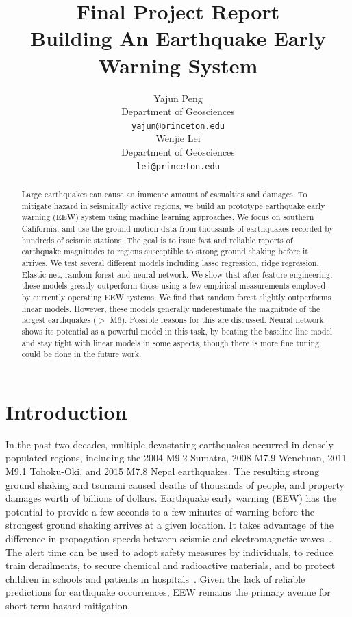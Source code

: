 \documentclass{article} %
\title{Final Project Report \\Building An Earthquake Early Warning System}
\author{
Yajun Peng\\
Department of Geosciences\\
\texttt{yajun@princeton.edu} \\
\And
Wenjie Lei \\
Department of Geosciences \\
\texttt{lei@princeton.edu} \\
}
\begin{document}
\maketitle

\begin{abstract}
Large earthquakes can cause an immense amount of casualties and damages. To mitigate hazard in seismically active regions, we build an prototype earthquake early warning (EEW) system using machine learning approaches. We focus on southern California, and use the ground motion data from thousands of earthquakes recorded by hundreds of seismic stations. The goal is to issue fast and reliable reports of earthquake magnitudes to regions susceptible to strong ground shaking before it arrives. We test several different models including lasso regression, ridge regression, Elastic net, random forest and neural network. We show that after feature engineering, these models greatly outperform those using a few empirical measurements employed by currently operating EEW systems. We find that random forest slightly outperforms linear models. However, these models generally underestimate the magnitude of the largest earthquakes ($>$ M6). Possible reasons for this are discussed. Neural network shows its potential as a powerful model in this task, by beating the baseline line model and stay tight with linear models in some aspects, though there is more fine tuning could be done in the future work.

\end{abstract}

\section{Introduction}
In the past two decades, multiple devastating earthquakes occurred in densely populated regions, including the 2004 M9.2 Sumatra, 2008 M7.9 Wenchuan, 2011 M9.1 Tohoku-Oki, and 2015 M7.8 Nepal earthquakes. The resulting strong ground shaking and tsunami caused deaths of thousands of people, and property damages worth of billions of dollars. Earthquake early warning (EEW) has the potential to provide a few seconds to
a few minutes of warning before the strongest ground shaking arrives at a given
location. It takes advantage of the difference in propagation speeds between seismic and
electromagnetic waves~\cite{Allen2009, Bose2009}. The alert time can be used to adopt safety measures by individuals, to reduce train derailments, to secure chemical and radioactive materials, and to protect children in schools and patients in hospitals~\cite{Strauss2016}. Given the lack of reliable predictions for earthquake occurrences, EEW remains the primary avenue for short-term hazard mitigation. 
\end{document}
